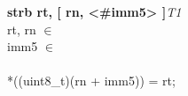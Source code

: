 


\begin{instructionblock}{\imagewidth}%
    \textbf{strb rt, [ rn, <\#imm5> ]}\hfill\textit{T1}\\
    rt, rn $\in$ \baseregisters\\
    imm5 $\in$ \immFive\\
    \\
    {*}((uint8\_t)(rn + imm5)) = rt;
\end{instructionblock}

